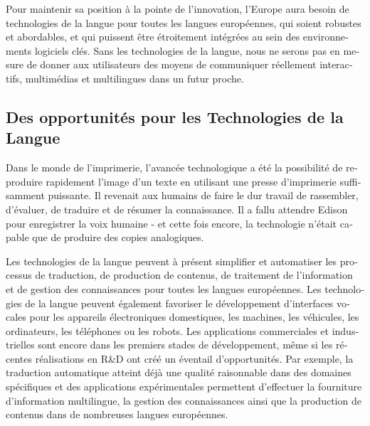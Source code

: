 \begin{french}
\begin{multicols}{2}
Pour maintenir sa position à la pointe de l'innovation,
l'Europe aura besoin de technologies de la langue pour toutes
les langues européennes, qui soient robustes et abordables, et qui
puissent être étroitement intégrées au sein des environnements
logiciels clés. Sans les technologies de la langue, nous ne serons pas
en mesure de donner aux utilisateurs des moyens de communiquer
réellement interactifs, multimédias et multilingues dans un futur
proche.

\subsection{Des opportunités pour les Technologies de la Langue}

Dans le monde de l'imprimerie, l'avancée technologique
a été la possibilité de reproduire rapidement l'image d'un texte en utilisant une presse d'imprimerie suffisamment
puissante. Il revenait aux humains de faire le dur travail de
rassembler, d'évaluer, de traduire et de résumer la
connaissance. Il a fallu attendre Edison pour enregistrer la voix
humaine - et cette fois encore, la technologie n'était capable
que de produire des copies analogiques.

Les technologies de la langue peuvent à présent simplifier et
automatiser les processus de traduction, de production de contenus, de
traitement de l'information et de gestion des connaissances
pour toutes les langues européennes. Les technologies de la langue
peuvent également favoriser le développement d'interfaces
vocales pour les appareils électroniques domestiques, les machines,
les véhicules, les ordinateurs, les téléphones ou les robots. Les applications
commerciales et industrielles sont encore dans les premiers stades de
développement, même si les récentes réalisations en R\&D ont créé un
éventail d'opportunités. Par exemple, la traduction
automatique atteint déjà une qualité raisonnable dans des domaines
spécifiques et des applications expérimentales permettent d'effectuer la fourniture d'information multilingue, la
gestion des connaissances ainsi que la production de contenus dans de
nombreuses langues européennes.



\end{multicols}
\end{french}
